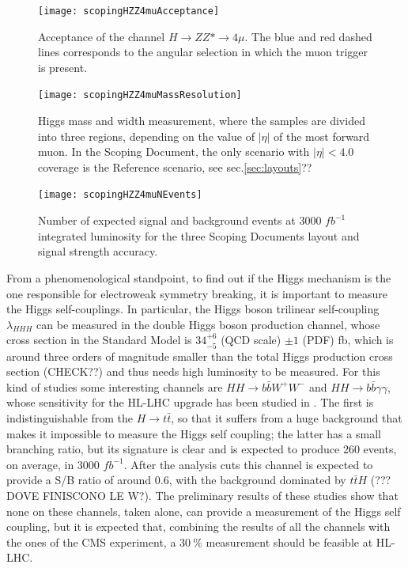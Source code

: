 \documentclass[a4paper,twoside,12pt]{article}
\begin{document}
\begin{figure} [h]
	\centering
	\texttt{[image: scopingHZZ4muAcceptance]}
	\caption{Acceptance of the channel $H \rightarrow ZZ* \rightarrow 4\mu$. The blue and 
	red dashed lines corresponds to the angular selection in which the muon trigger is present.}
	\label{fig:scopingHZZ4muAcceptance}
\end{figure}

\begin{figure} [h]
	\centering
	\texttt{[image: scopingHZZ4muMassResolution]}
	\caption{Higgs mass and width measurement, where the samples are divided into three 
	regions, depending on the value of $|\eta|$ of the most forward muon\cite{scoping}. In the Scoping Document, the only scenario with $|\eta| < 4.0$ coverage is the Reference scenario, see sec.\ref{sec:layouts}??}
	\label{fig:scopingHZZ4MassResolution}
\end{figure}

\begin{figure} [h]
	\centering
	\texttt{[image: scopingHZZ4muNEvents]}
	\caption{Number of expected signal and background events at 3000 $fb^{-1}$ integrated
	luminosity for the three Scoping Documents layout and signal strength accuracy\cite{scoping}.}
	\label{fig:scopingHZZ4muNEvents}
\end{figure}


\bigskip
\bigskip
\bigskip


From a phenomenological standpoint, to find out if the Higgs mechanism is the one responsible
for electroweak symmetry breaking, it is important to measure the Higgs self-couplings.
In particular, the Higgs boson trilinear self-coupling $\lambda_{HHH}$ can be measured
in the double Higgs boson production channel, whose cross section in the Standard Model is
$34^{+6}_{-5}$ (QCD scale) $\pm 1$ (PDF) fb, which is around three orders of magnitude
smaller than the total Higgs production cross section (CHECK??) and thus needs high
luminosity to be measured. For this kind of studies some interesting channels are
$HH \rightarrow b\bar{b}W^+W^-$ and $HH \rightarrow b\bar{b}\gamma\gamma$, whose 
sensitivity for the HL-LHC upgrade has been studied in \cite{HHStudies}. The first is 
indistinguishable from the $H \rightarrow t\bar{t}$, so that it suffers from a huge background
that makes it impossible to measure the Higgs self coupling; the latter has a small branching
ratio, but its signature is clear and is expected to produce 260 events, on average, in 3000 $fb^{-1}$. After the analysis cuts this channel is expected to provide a S/B ratio of around 0.6, with the background
dominated by $t\bar{t}H$ (??? DOVE FINISCONO LE W?). The preliminary results of these
studies show that none on these channels, taken alone, can provide a measurement of
the Higgs self coupling, but it is expected that, combining the results of all the channels with 
the ones of the CMS experiment, a $30\ \%$ measurement should be feasible at HL-LHC.
\end{document}
